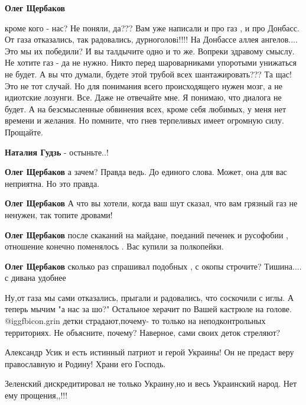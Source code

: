 \begin{itemize}
\begin{itemize}
\begin{itemize}
\textbf{Олег Щербаков} 

кроме кого - нас? Не поняли, да??? Вам уже написали и про газ , и про Донбасс.
От газа отказались, так радовались, дурноголовi!!!! На Донбассе аллея
ангелов.... Это мы их победили? И вы талдычите одно и то же. Вопреки здравому
смыслу. Не хотите газ - да не нужно. Никто перед шароварниками упоротыми
унижаться не будет. А вы что думали, будете этой трубой всех шантажировать???
Та щас! Это не тот случай. Но для понимания всего происходящего нужен мозг, а
не идиотские лозунги. Все. Даже не отвечайте мне. Я понимаю, что диалога не
будет. А на безсмысленные обвинения всех, кроме себя любимых, у меня нет
времени и желания. Но помните, что гнев терпеливых имеет огромную силу.
Прощайте.


\textbf{Наталия Гудзь} - остыньте..!

\textbf{Олег Щербаков} а зачем? Правда ведь. До единого слова. Может, она для вас неприятна. Но это правда.

\textbf{Олег Щербаков} А что вы хотели, когда ваш шут сказал, что вам грязный газ не ненужен, так топите дровами!

\textbf{Олег Щербаков} после скаканий на майдане, поеданий печенек и русофобии , отношение конечно поменялось . Вас купили за полкопейки.

\textbf{Олег Щербаков} сколько раз спрашивал подобных , с окопы строчите? Тишина.... с дивана удобнее


\end{itemize} %


Ну,от газа мы сами отказались, прыгали и радовались, что соскочили с иглы. А
теперь мычим "а нас за шо?" Остальное херачит по Вашей кастрюле на голове. @igg{fbicon.grin} 
детки страдают,почему- то только на неподконтрольных территориях. Не объясните,
почему? Наверное, сами своих деток стреляют?


\end{itemize} %

Александр Усик и есть истинный патриот и герой Украины! Он не предаст веру православную и Родину! Храни его Господь.

Зеленский дискредитировал не только Украину,но и весь Украинский народ. Нет ему прощения,,!!!



\end{itemize}
